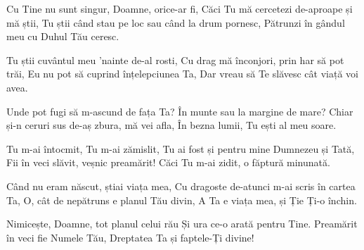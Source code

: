 

\beginverse
Cu Tine nu sunt singur, Doamne, orice-ar fi,
Căci Tu mă cercetezi de-aproape și mă știi,
Tu știi când stau pe loc sau când la drum pornesc,
Pătrunzi în gândul meu cu Duhul Tău ceresc.
\endverse

\beginverse
Tu știi cuvântul meu 'nainte de-al rosti,
Cu drag mă înconjori, prin har să pot trăi,
Eu nu pot să cuprind înțelepciunea Ta,
Dar vreau să Te slăvesc cât viață voi avea.
\endverse

\beginverse
Unde pot fugi să m-ascund de fața Ta?
În munte sau la margine de mare?
Chiar și-n ceruri sus de-aș zbura, mă vei afla,
În bezna lumii, Tu ești al meu soare.
\endverse

\beginchorus
Tu m-ai întocmit, Tu m-ai zămislit,
Tu ai fost și pentru mine Dumnezeu și Tată,
Fii în veci slăvit, veșnic preamărit!
Căci Tu m-ai zidit, o făptură minunată.
\endchorus

\beginverse
Când nu eram născut, știai viața mea,
Cu dragoste de-atunci m-ai scris în cartea Ta,
O, cât de nepătruns e planul Tău divin,
A Ta e viața mea, și Ție Ți-o închin.
\endverse

\beginverse
Nimicește, Doamne, tot planul celui rău
Și ura ce-o arată pentru Tine.
Preamărit în veci fie Numele Tău,
Dreptatea Ta și faptele-Ți divine!
\endverse


\endsong
